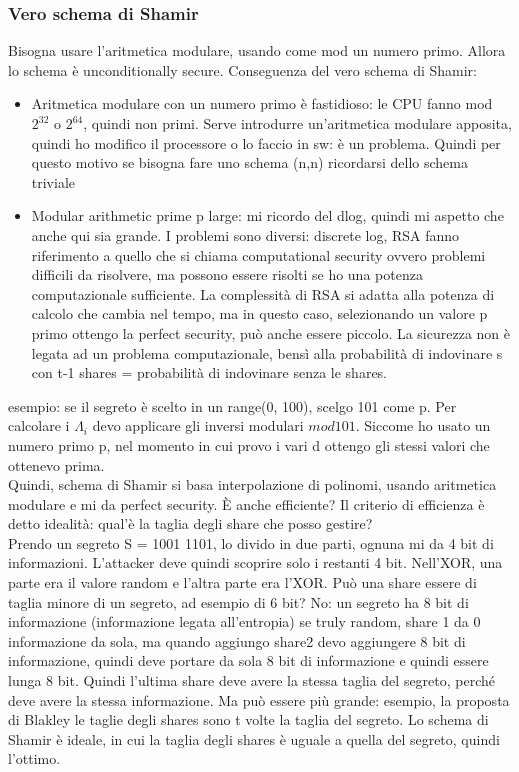 \documentclass[16px]{article}
\begin{document}
\subsubsection{Vero schema di Shamir}
Bisogna usare l'aritmetica modulare, usando come mod un numero primo. Allora lo schema è unconditionally secure. Conseguenza del vero schema di Shamir:
\begin{itemize}
\item Aritmetica modulare con un numero primo è fastidioso: le CPU fanno mod $2^{32}$ o $2^{64}$, quindi non primi. Serve introdurre un'aritmetica modulare apposita, quindi ho modifico il processore o lo faccio in sw: è un problema. Quindi per questo motivo se bisogna fare uno schema (n,n) ricordarsi dello schema triviale
\item Modular arithmetic prime p large: mi ricordo del dlog, quindi mi aspetto che anche qui sia grande. I problemi sono diversi: discrete log, RSA fanno riferimento a quello che si chiama computational security ovvero problemi difficili da risolvere, ma possono essere risolti se ho una potenza computazionale sufficiente. La complessità di RSA si adatta alla potenza di calcolo che cambia nel tempo, ma in questo caso, selezionando un valore p primo ottengo la perfect security, può anche essere piccolo. La sicurezza non è legata ad un problema computazionale, bensì alla probabilità di indovinare s con t-1 shares = probabilità di indovinare senza le shares.
\end{itemize}
esempio: se il segreto è scelto in un range(0, 100), scelgo 101 come p. Per calcolare i $\Lambda_i$ devo applicare gli inversi modulari $mod101$. Siccome ho usato un numero primo p, nel momento in cui provo i vari d ottengo gli stessi valori che ottenevo prima.\\ Quindi, schema di Shamir si basa interpolazione di polinomi, usando aritmetica modulare e mi da perfect security. È anche efficiente? Il criterio di efficienza è detto idealità: qual'è la taglia degli share che posso gestire?\\ Prendo un segreto S = 1001 1101, lo divido in due parti, ognuna mi da 4 bit di informazioni. L'attacker deve quindi scoprire solo i restanti 4 bit. Nell'XOR, una parte era il valore random e l'altra parte era l'XOR. Può una share essere di taglia minore di un segreto, ad esempio di 6 bit? No: un segreto ha 8 bit di informazione (informazione legata all'entropia) se truly random, share 1 da 0 informazione da sola, ma quando aggiungo share2 devo aggiungere 8 bit di informazione, quindi deve portare da sola 8 bit di informazione e quindi essere lunga 8 bit. Quindi l'ultima share deve avere la stessa taglia del segreto, perché deve avere la stessa informazione. Ma può essere più grande: esempio, la proposta di Blakley le taglie degli shares sono t volte la taglia del segreto. Lo schema di  Shamir è ideale, in cui la taglia degli shares è uguale a quella del segreto, quindi l'ottimo.
\end{document}

